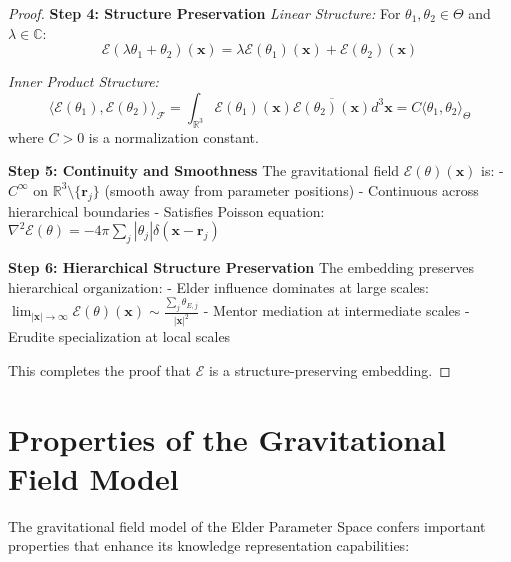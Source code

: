 \begin{proof}
\textbf{Step 4: Structure Preservation}
\textit{Linear Structure:} For $\theta_1, \theta_2 \in \Theta$ and $\lambda \in \mathbb{C}$:
$$\mathcal{E}(\lambda\theta_1 + \theta_2)(\mathbf{x}) = \lambda\mathcal{E}(\theta_1)(\mathbf{x}) + \mathcal{E}(\theta_2)(\mathbf{x})$$

\textit{Inner Product Structure:} 
$$\langle \mathcal{E}(\theta_1), \mathcal{E}(\theta_2) \rangle_{\mathcal{F}} = \int_{\mathbb{R}^3} \mathcal{E}(\theta_1)(\mathbf{x}) \overline{\mathcal{E}(\theta_2)(\mathbf{x})} d^3\mathbf{x} = C \langle \theta_1, \theta_2 \rangle_\Theta$$
where $C > 0$ is a normalization constant.

\textbf{Step 5: Continuity and Smoothness}
The gravitational field $\mathcal{E}(\theta)(\mathbf{x})$ is:
- $C^\infty$ on $\mathbb{R}^3 \setminus \{\mathbf{r}_j\}$ (smooth away from parameter positions)
- Continuous across hierarchical boundaries
- Satisfies Poisson equation: $\nabla^2 \mathcal{E}(\theta) = -4\pi \sum_j |\theta_j| \delta(\mathbf{x} - \mathbf{r}_j)$

\textbf{Step 6: Hierarchical Structure Preservation}
The embedding preserves hierarchical organization:
- Elder influence dominates at large scales: $\lim_{|\mathbf{x}| \to \infty} \mathcal{E}(\theta)(\mathbf{x}) \sim \frac{\sum_j \theta_{E,j}}{|\mathbf{x}|^2}$
- Mentor mediation at intermediate scales
- Erudite specialization at local scales

This completes the proof that $\mathcal{E}$ is a structure-preserving embedding.
\end{proof}

\section{Properties of the Gravitational Field Model}

The gravitational field model of the Elder Parameter Space confers important properties that enhance its knowledge representation capabilities:

